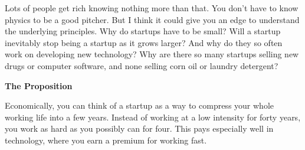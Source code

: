\documentclass[12pt]{book}
\begin{document}
Lots of people get rich knowing nothing more than that. You don't have
to know physics to be a good pitcher. But I think it could give you an
edge to understand the underlying principles. Why do startups have to be
small? Will a startup inevitably stop being a startup as it grows
larger? And why do they so often work on developing new technology? Why
are there so many startups selling new drugs or computer software, and
none selling corn oil or laundry detergent?

\textbf{The Proposition}

Economically, you can think of a startup as a way to compress your whole
working life into a few years. Instead of working at a low intensity for
forty years, you work as hard as you possibly can for four. This pays
especially well in technology, where you earn a premium for working
fast.
\end{document}
